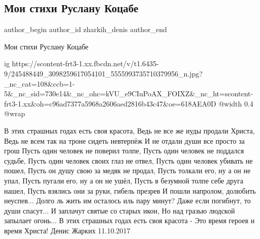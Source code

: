  
 
 
 
 
 
\subsection{Мои стихи Руслану Коцабе}
\label{sec:13_10_2021.fb.zharkih_denis.1.stihi_ruslan_kocaba}
 
\ifcmt
 author_begin
   author_id zharkih_denis
 author_end
\fi

Мои стихи Руслану Коцабе

\ifcmt
  ig https://scontent-frt3-1.xx.fbcdn.net/v/t1.6435-9/245488449_3098259617054101_5555993735710379956_n.jpg?_nc_cat=108&ccb=1-5&_nc_sid=730e14&_nc_ohc=kVU_e9CIuPoAX_FOIXZ&_nc_ht=scontent-frt3-1.xx&oh=c96ad7377a5968a2606aed2816b43c47&oe=618AEA0D
  @width 0.4
  @wrap 
\fi

В этих страшных годах есть своя красота,
Ведь не все же иуды продали Христа,
Ведь не всем так на троне сидеть невтерпёж
И не отдали души все просто за грош
Пусть один человек не поверил толпе,
Пусть один человек не поддался судьбе,
Пусть один человек своих глаз не отвел,
Пусть один человек убивать не пошел,
Пусть он душу свою за медяк не продал,
Пусть толкали его, ну а он не упал,
Пусть пугали его, ну а он не ушёл,
Пусть в безумной толпе себе друга нашел,
Пусть взялись они за руки, гибель презрев
И пошли напролом, долюбить неуспев...
Долго ль жить им осталось иль пару минут?
Даже если погибнут, то души спасут...
И заплачут святые со старых икон,
Но над гразью людской запылает огонь...
В этих страшных годах есть своя красота -
Это время героев и время Христа!
Денис Жарких 11.10.2017
